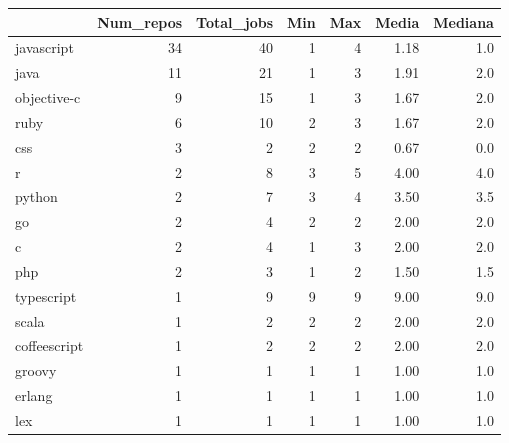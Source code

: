 \begin{tabular}{lrrrrrr}
\toprule
{} &  Num\_repos &  Total\_jobs &  Min &  Max &  Media &  Mediana \\
\midrule
javascript   &         34 &          40 &    1 &    4 &   1.18 &      1.0 \\
java         &         11 &          21 &    1 &    3 &   1.91 &      2.0 \\
objective-c  &          9 &          15 &    1 &    3 &   1.67 &      2.0 \\
ruby         &          6 &          10 &    2 &    3 &   1.67 &      2.0 \\
css          &          3 &           2 &    2 &    2 &   0.67 &      0.0 \\
r            &          2 &           8 &    3 &    5 &   4.00 &      4.0 \\
python       &          2 &           7 &    3 &    4 &   3.50 &      3.5 \\
go           &          2 &           4 &    2 &    2 &   2.00 &      2.0 \\
c            &          2 &           4 &    1 &    3 &   2.00 &      2.0 \\
php          &          2 &           3 &    1 &    2 &   1.50 &      1.5 \\
typescript   &          1 &           9 &    9 &    9 &   9.00 &      9.0 \\
scala        &          1 &           2 &    2 &    2 &   2.00 &      2.0 \\
coffeescript &          1 &           2 &    2 &    2 &   2.00 &      2.0 \\
groovy       &          1 &           1 &    1 &    1 &   1.00 &      1.0 \\
erlang       &          1 &           1 &    1 &    1 &   1.00 &      1.0 \\
lex          &          1 &           1 &    1 &    1 &   1.00 &      1.0 \\
\bottomrule
\end{tabular}
